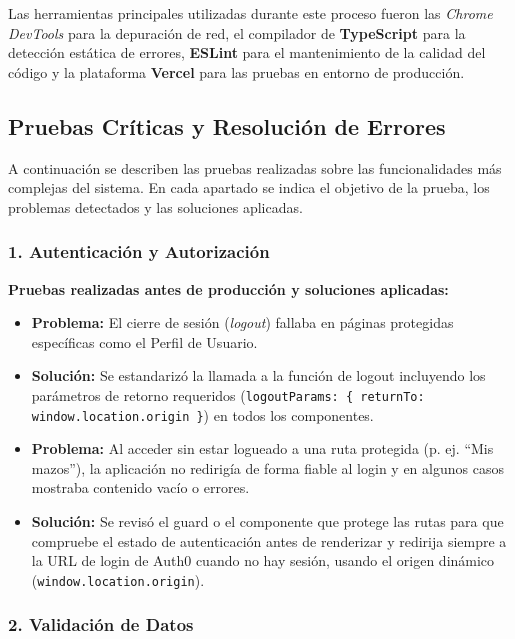 Las herramientas principales utilizadas durante este proceso fueron las \textit{Chrome DevTools} para la depuración de red, el compilador de \textbf{TypeScript} para la detección estática de errores, \textbf{ESLint} para el mantenimiento de la calidad del código y la plataforma \textbf{Vercel} para las pruebas en entorno de producción.

\subsection{Pruebas Críticas y Resolución de Errores}

A continuación se describen las pruebas realizadas sobre las funcionalidades más complejas del sistema. En cada apartado se indica el objetivo de la prueba, los problemas detectados y las soluciones aplicadas.

\subsubsection{1. Autenticación y Autorización}

\textbf{Pruebas realizadas antes de producción y soluciones aplicadas:}

\begin{itemize}
    \item \textbf{Problema:} El cierre de sesión (\textit{logout}) fallaba en páginas protegidas específicas como el Perfil de Usuario.
    \item \textbf{Solución:} Se estandarizó la llamada a la función de logout incluyendo los parámetros de retorno requeridos (\texttt{logoutParams: \{ returnTo: window.location.origin \}}) en todos los componentes.

    \item \textbf{Problema:} Al acceder sin estar logueado a una ruta protegida (p. ej. ``Mis mazos''), la aplicación no redirigía de forma fiable al login y en algunos casos mostraba contenido vacío o errores.
    \item \textbf{Solución:} Se revisó el guard o el componente que protege las rutas para que compruebe el estado de autenticación antes de renderizar y redirija siempre a la URL de login de Auth0 cuando no hay sesión, usando el origen dinámico (\texttt{window.location.origin}).
\end{itemize}

\subsubsection{2. Validación de Datos}

